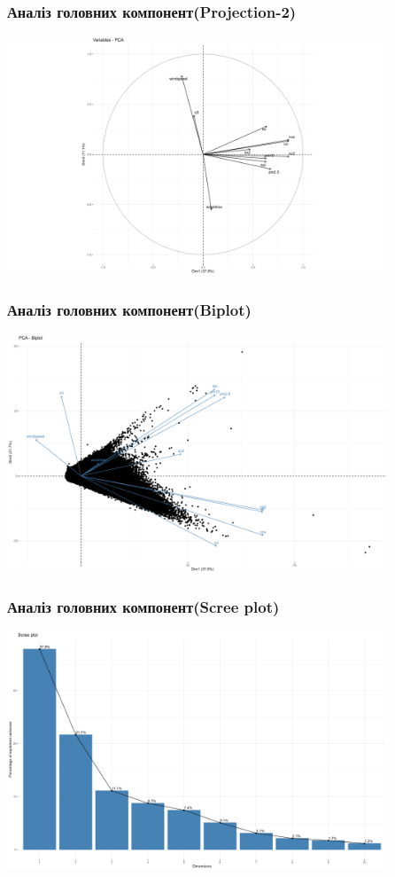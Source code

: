 ﻿\documentclass{beamer}
\begin{document}
\begin{frame}
\frametitle{Аналіз головних компонент(Projection-2)}
  \includegraphics[height=2.8in]{plots/lab4/pca/projection-1-3.png}
\end{frame}

\begin{frame}
\frametitle{Аналіз головних компонент(Biplot)}
  \includegraphics[height=2.8in]{plots/lab4/pca/biplot.png}
\end{frame}

\begin{frame}
\frametitle{Аналіз головних компонент(Scree plot)}
  \includegraphics[height=2.8in]{plots/lab4/pca/scree.png}
\end{frame}
\end{document}
